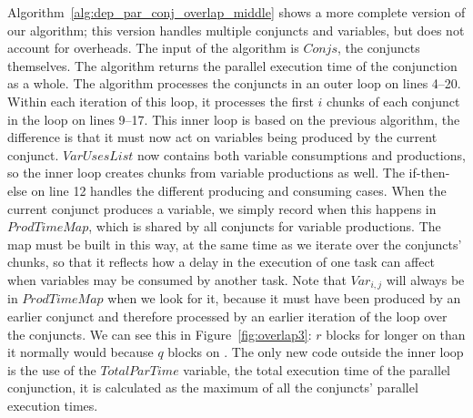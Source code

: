Algorithm~\ref{alg:dep_par_conj_overlap_middle} shows a more complete
version of our algorithm;
this version handles multiple conjuncts and variables,
but does not account for overheads.
The input of the algorithm is $Conjs$,
the conjuncts themselves.
The algorithm returns the parallel execution time of the conjunction as a
whole.
The algorithm processes the conjuncts in an outer loop on lines 4--20.
Within each iteration of this loop,
it processes the first $i$ chunks of each conjunct in the loop on lines 9--17.
This inner loop is based on the previous algorithm,
the difference is that it must now act on variables being produced by the
current conjunct.
$VarUsesList$ now contains both variable consumptions and productions,
so the inner loop creates chunks from variable productions as well.
The if-then-else on line 12 handles the different producing and consuming
cases.
When the current conjunct
produces a variable, we simply record when this happens in $ProdTimeMap$,
which is shared by all conjuncts for variable productions.
The map must be built in this way, at the same time as we iterate over the
conjuncts' chunks,
so that it reflects how a delay in the execution of one task can affect when
variables may be consumed by another task.
Note that $Var_{i, j}$
will always be in $ProdTimeMap$ when we look for it,
because it must have been produced by an earlier conjunct
and therefore processed by an earlier iteration of the loop over the
conjuncts.
We can see this in Figure~\ref{fig:overlap3}:
$r$ blocks for longer on  than it normally would because $q$ blocks
on .
The only new code outside the inner loop is the use of the $TotalParTime$
variable,
the total execution time of the parallel conjunction,
it is calculated as the maximum of all the conjuncts' parallel execution
times.

%
%

